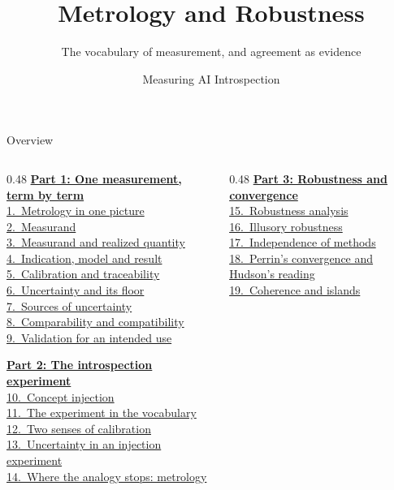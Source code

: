 \documentclass[aspectratio=169,11pt]{beamer}
\title{Metrology and Robustness}
\subtitle{The vocabulary of measurement, and agreement as evidence}
\author{Measuring AI Introspection}
\date{}
\institute{}
\begin{document}
\maketitle

\begin{frame}{Overview}\footnotesize
\begin{columns}[T]
\begin{column}{0.48\textwidth}
\hyperlink{part1}{\textbf{Part 1: One measurement, term by term}}\\[0.15em]
{\scriptsize%
\quad\hyperlink{picture}{1.~Metrology in one picture}\\%
\quad\hyperlink{measurand}{2.~Measurand}\\%
\quad\hyperlink{gaps}{3.~Measurand and realized quantity}\\%
\quad\hyperlink{indication}{4.~Indication, model and result}\\%
\quad\hyperlink{calibration}{5.~Calibration and traceability}\\%
\quad\hyperlink{uncertainty}{6.~Uncertainty and its floor}\\%
\quad\hyperlink{sources}{7.~Sources of uncertainty}\\%
\quad\hyperlink{compare}{8.~Comparability and compatibility}\\%
\quad\hyperlink{validation}{9.~Validation for an intended use}%
}\vspace{0.3em}

\hyperlink{part2}{\textbf{Part 2: The introspection experiment}}\\[0.15em]
{\scriptsize%
\quad\hyperlink{injection}{10.~Concept injection}\\%
\quad\hyperlink{mapping}{11.~The experiment in the vocabulary}\\%
\quad\hyperlink{twosenses}{12.~Two senses of calibration}\\%
\quad\hyperlink{llmunc}{13.~Uncertainty in an injection experiment}\\%
\quad\hyperlink{limitsmet}{14.~Where the analogy stops: metrology}%
}
\end{column}
\begin{column}{0.48\textwidth}
\hyperlink{part3}{\textbf{Part 3: Robustness and convergence}}\\[0.15em]
{\scriptsize%
\quad\hyperlink{wimsatt}{15.~Robustness analysis}\\%
\quad\hyperlink{illusory}{16.~Illusory robustness}\\%
\quad\hyperlink{cf}{17.~Independence of methods}\\%
\quad\hyperlink{perrin}{18.~Perrin's convergence and Hudson's reading}\\%
\quad\hyperlink{islands}{19.~Coherence and islands}%
}\vspace{0.3em}


\end{column}
\end{columns}
\end{frame}
\end{document}
